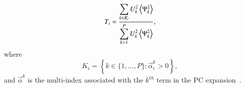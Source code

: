 %

\begin{equation} \label{eq:T-hard}
   T_i =
         \frac{\displaystyle
               \sum_{k \in K_i} U_k^2 \left\langle {\Psi_k^2} \right\rangle}
              {\displaystyle\sum_{k = 1}^P U_k^2 \left\langle {\Psi_k^2} \right\rangle},
\end{equation}
where \[
   K_i = \left\{ k \in \{1, \ldots, P\} :
           \vec{\alpha}^k_i > 0 \right\},
        \]
and $\vec{\alpha}^k$ is the multi-index associated with the $k^{th}$ term in the
PC expansion~\cite{LeMaitreKnio2010}.



